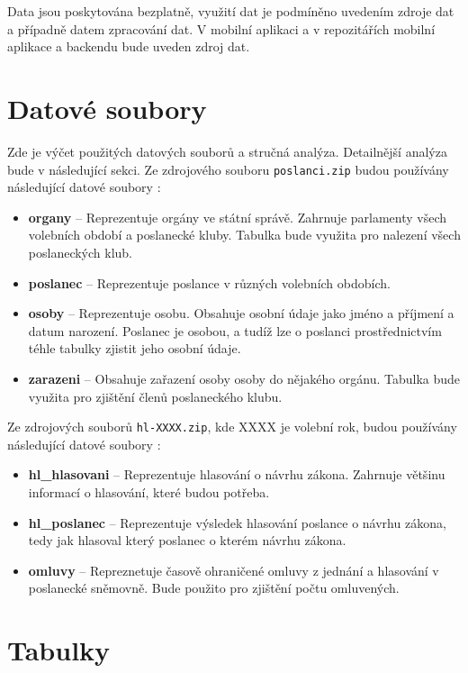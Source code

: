 Data jsou poskytována bezplatně, využití dat je podmíněno uvedením zdroje dat a případně datem zpracování dat. V mobilní aplikaci a v repozitářích mobilní aplikace a backendu bude uveden zdroj dat. 

\section{Datové soubory}

Zde je výčet použitých datových souborů a stručná analýza. Detailnější analýza bude v následující sekci. Ze zdrojového souboru \lstinline|poslanci.zip| budou používány následující datové soubory \cite{zip-members}:

\begin{itemize}
	\item \textbf{organy} -- Reprezentuje orgány ve státní správě. Zahrnuje parlamenty všech volebních období a poslanecké kluby. Tabulka bude využita pro nalezení všech poslaneckých klub.
	\item \textbf{poslanec} -- Reprezentuje poslance v různých volebních obdobích.
	\item \textbf{osoby} -- Reprezentuje osobu. Obsahuje osobní údaje jako jméno a příjmení a datum narození. Poslanec je osobou, a tudíž lze o poslanci prostřednictvím téhle tabulky zjistit jeho osobní údaje.
	\item \textbf{zarazeni} -- Obsahuje zařazení osoby osoby do nějakého orgánu. Tabulka bude využita pro zjištění členů poslaneckého klubu.
\end{itemize}

\noindent Ze zdrojových souborů \lstinline|hl-XXXX.zip|, kde XXXX je volební rok, budou používány následující datové soubory \cite{zip-votes}:

\begin{itemize}
	\item \textbf{hl\_hlasovani} -- Reprezentuje hlasování o návrhu zákona. Zahrnuje většinu informací o hlasování, které budou potřeba.
	\item \textbf{hl\_poslanec} -- Reprezentuje výsledek hlasování poslance o návrhu zákona, tedy jak hlasoval který poslanec o kterém návrhu zákona.
	\item \textbf{omluvy} -- Repreznetuje časově ohraničené omluvy z jednání a hlasování v poslanecké sněmovně. Bude použito pro zjištění počtu omluvených. 
\end{itemize}

\section{Tabulky}

